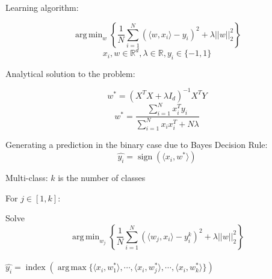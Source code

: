 \documentclass[article,12pt]{article}
\DeclareMathOperator*{\argmin}{arg\,min}
\DeclareMathOperator*{\argmax}{arg\,max}
\DeclareMathOperator{\sign}{sign}
\DeclareMathOperator{\ind}{index}
\begin{document}
Learning algorithm:

$$ \argmin_{w} \left\{ \frac{1}{N} \sum_{i=1}^N (\langle w, x_i \rangle  - y_i)^2 + \lambda || w ||_2^2 \right\}$$
$$ x_i, w \in \mathbb{R}^d, \lambda \in \mathbb{R}, y_i \in \{-1, 1\}$$

Analytical solution to the problem:

$$ w^* = \left(X^TX + \lambda I_d\right)^{-1} X^T Y$$
$$ w^* = \frac{ \sum_{i=1}^N x_i^{T}y_i}{\sum_{i=1}^N x_ix_i^T + N\lambda}$$

Generating a prediction in the binary case due to Bayes Decision Rule:
$$ \hat{y_i} = \sign(\langle x_i, w^* \rangle)$$


Multi-class: $k$ is the number of classes

For $j \in [1, k]$:

Solve 
$$ \argmin_{w_j} \left\{ \frac{1}{N} \sum_{i=1}^N (\langle w_j, x_i \rangle  - y_i^k)^2 + \lambda || w ||_2^2 \right\}$$\\

$\hat{y_i} = \ind \left(\argmax \{ \langle x_i,w_1^* \rangle, \cdots, \langle x_i,w_j^*\rangle, \cdots, \langle x_i,w_k^*\rangle\}\right)$





\end{document}
